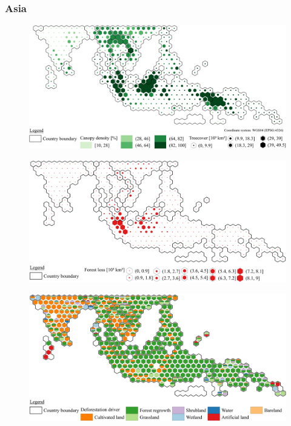 		\subsubsection{Asia}
			\begin{figure}[ht]
				\centering
				\includegraphics[scale=1]{img/asia_treecover_frameless}
				\caption[Ecosystem service values]{}
				\label{fig:asiacover}
			\end{figure}
			\begin{figure}[ht]
				\centering
				\includegraphics[scale=1]{img/asia_loss_frameless}
				\caption[Ecosystem service values]{}
				\label{fig:asialoss}
			\end{figure}
			\begin{figure}[ht]
				\centering
				\includegraphics[scale=1]{img/asia_driver_frameless}
				\caption[Ecosystem service values]{}
				\label{fig:asiadriver}
			\end{figure}

